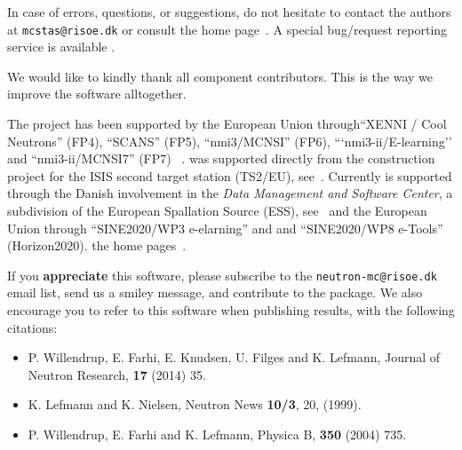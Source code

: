 In case of errors, questions, or suggestions,
do not hesitate to
contact the authors at \verb+mcstas@risoe.dk+
or consult the \MCS home page~\cite{mcstas_webpage}. A special bug/request reporting service is available \cite{github_issue_webpage}.

We would like to kindly thank all \MCS component contributors. This is the way we improve the software alltogether.

The \MCS project has been supported by the European Union
through``XENNI / Cool Neutrons'' (FP4), ``SCANS'' (FP5),
``nmi3/MCNSI'' (FP6), ```nmi3-ii/E-learning'' and ``nmi3-ii/MCNSI7''
(FP7) ~\cite{nmi3_webpage,mcnsi_webpage}.
\MCS was supported directly from the construction project for the ISIS second
target station (TS2/EU), see~\cite{ts2_webpage}. Currently \MCS is 
supported through the Danish involvement in the \emph{Data Management
  and Software Center}, a subdivision of the 
European Spallation Source (ESS), see~\cite{ess_webpage} and the
European Union through ``SINE2020/WP3 e-elarning''
and and ``SINE2020/WP8 e-Tools'' (Horizon2020).
the home pages~\cite{sine2020_webpage}.


If you \textbf{appreciate} this software, please subscribe to the \verb+neutron-mc@risoe.dk+ email list, send us a smiley message, and contribute to the package. We also encourage you to refer to this software when publishing results, with the following citations:
\begin{itemize}
\item{P. Willendrup, E. Farhi, E. Knudsen, U. Filges and K. Lefmann,
    Journal of Neutron Research, \textbf{17} (2014) 35.}
\item{K. Lefmann and K. Nielsen, Neutron News \textbf{10/3}, 20, (1999).}
\item{P. Willendrup, E. Farhi and K. Lefmann, Physica B, \textbf{350}
    (2004) 735.}
\end{itemize}






